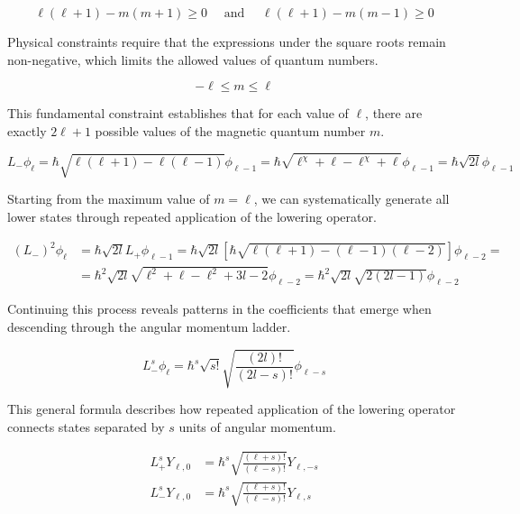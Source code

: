 \begin{equation}
\ell(\ell+1)-m(m+1) \geq 0 \quad \text { and } \quad \ell(\ell+1)-m(m-1) \geq 0
\end{equation}

Physical constraints require that the expressions under the square roots remain non-negative, which limits the allowed values of quantum numbers.

\begin{equation}
-\ell \leq m \leq \ell
\end{equation}

This fundamental constraint establishes that for each value of $\ell$, there are exactly $2\ell+1$ possible values of the magnetic quantum number $m$.

\begin{equation}
L_{-} \phi_{\ell}=\hbar \sqrt{\ell(\ell+1)-\ell(\ell-1)} \phi_{\ell-1}=\hbar \sqrt{\ell^{\chi}+\ell-\ell^{\chi}+\ell} \phi_{\ell-1}=\hbar \sqrt{2 l} \phi_{\ell-1}
\end{equation}

Starting from the maximum value of $m=\ell$, we can systematically generate all lower states through repeated application of the lowering operator.

\begin{align}
\left(L_{-}\right)^{2} \phi_{\ell} & =\hbar \sqrt{2 l} L_{+} \phi_{\ell-1}=\hbar \sqrt{2 l}[\hbar \sqrt{\ell(\ell+1)-(\ell-1)(\ell-2)}] \phi_{\ell-2}= \\
& =\hbar^{2} \sqrt{2 l} \sqrt{\ell^{2}+\ell-\ell^{2}+3 l-2} \phi_{\ell-2}=\hbar^{2} \sqrt{2 l} \sqrt{2(2 l-1)} \phi_{\ell-2}
\end{align}

Continuing this process reveals patterns in the coefficients that emerge when descending through the angular momentum ladder.

\begin{equation}
L_{-}^{s} \phi_{\ell}=\hbar^{s} \sqrt{s!} \sqrt{\frac{(2 l)!}{(2 l-s)!}} \phi_{\ell-s}
\end{equation}

This general formula describes how repeated application of the lowering operator connects states separated by $s$ units of angular momentum.

\begin{align}
L_{+}^{s} Y_{\ell, 0} & =\hbar^{s} \sqrt{\frac{(\ell+s)!}{(\ell-s)!}} Y_{\ell,-s} \\
L_{-}^{s} Y_{\ell, 0} & =\hbar^{s} \sqrt{\frac{(\ell+s)!}{(\ell-s)!}} Y_{\ell, s}
\end{align}

